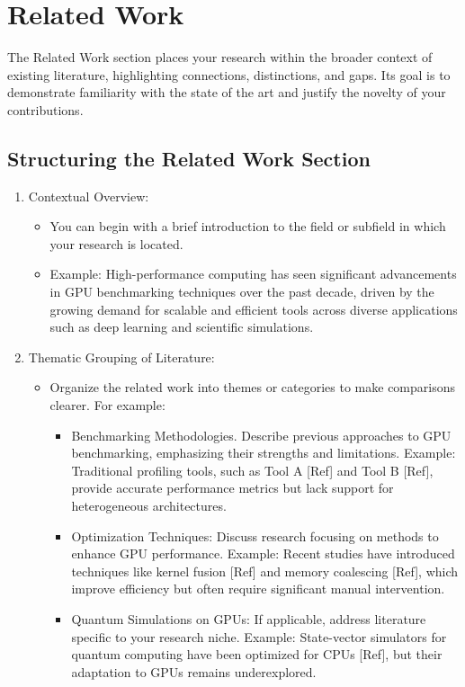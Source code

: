 \documentclass[conference]{IEEEtran}
\begin{document}
\section{Related Work}\label{sec:relwork}
The Related Work section places your research within the broader context of existing literature, highlighting connections, distinctions, and gaps. Its goal is to demonstrate familiarity with the state of the art and justify the novelty of your contributions.

\subsection{Structuring the Related Work Section}
\begin{enumerate}
\item Contextual Overview:  
\begin{itemize}
   \item You can begin with a brief introduction to the field or subfield in which your research is located.  
   \item Example: High-performance computing has seen significant advancements in GPU benchmarking techniques over the past decade, driven by the growing demand for scalable and efficient tools across diverse applications such as deep learning and scientific simulations.  
\end{itemize}

\item Thematic Grouping of Literature:  
\begin{itemize}
   \item Organize the related work into themes or categories to make comparisons clearer. For example:  
\begin{itemize}
     \item Benchmarking Methodologies. Describe previous approaches to GPU benchmarking, emphasizing their strengths and limitations. Example: Traditional profiling tools, such as Tool A [Ref] and Tool B [Ref], provide accurate performance metrics but lack support for heterogeneous architectures. 
     \item Optimization Techniques: Discuss research focusing on methods to enhance GPU performance. Example: Recent studies have introduced techniques like kernel fusion [Ref] and memory coalescing [Ref], which improve efficiency but often require significant manual intervention.  
     \item Quantum Simulations on GPUs: If applicable, address literature specific to your research niche. Example: State-vector simulators for quantum computing have been optimized for CPUs [Ref], but their adaptation to GPUs remains underexplored.  
\end{itemize}
\end{itemize}


\end{enumerate}
\end{document}
